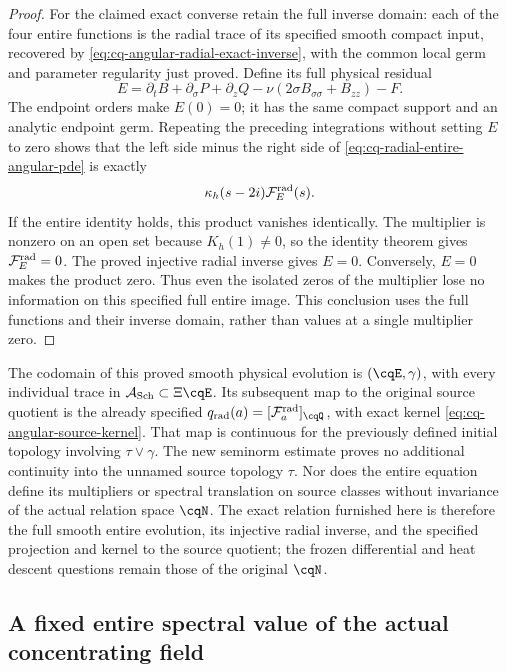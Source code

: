 \begin{proof}
For the claimed exact converse retain the full inverse domain:
each of the four entire functions is the radial trace of its
specified smooth compact input, recovered by
\eqref{eq:cq-angular-radial-exact-inverse}, with the common local
germ and parameter regularity just proved. Define its full
physical residual
\[
 E=\partial_tB+\partial_\sigma P+\partial_zQ
                  -\nu(2\sigma B_{\sigma\sigma}+B_{zz})-F.
\]
The endpoint orders make $E(0)=0$; it has the same compact support
and an analytic endpoint germ. Repeating the preceding integrations
without setting $E$ to zero shows that the left side minus the
right side of \eqref{eq:cq-radial-entire-angular-pde} is exactly
\begin{equation}
 \kappa_h(s-2i)\mathcal F_E^{\rm rad}(s).
\label{eq:cq-radial-entire-residual-defect}
\end{equation}
If the entire identity holds, this product vanishes identically.
The multiplier is nonzero on an open set because $K_h(1)\ne0$,
so the identity theorem gives $\mathcal F_E^{\rm rad}=0$.
The proved injective radial inverse gives $E=0$. Conversely,
$E=0$ makes the product zero. Thus even the isolated zeros of the
multiplier lose no information on this specified full entire
image. This conclusion uses the full functions and their inverse
domain, rather than values at a single multiplier zero.
\end{proof}

The codomain of this proved smooth physical evolution is
$(\cqE,\gamma)$, with every individual trace in
$\mathcal A_{\rm Sch}\subset\Xi\cqE$. Its subsequent map to
the original source quotient is the already specified
$q_{\rm rad}(a)=[\mathcal F_a^{\rm rad}]_{\cqQ}$, with exact
kernel \eqref{eq:cq-angular-source-kernel}. That map is continuous
for the previously defined initial topology involving
$\tau\vee\gamma$. The new seminorm estimate proves no additional
continuity into the unnamed source topology $\tau$. Nor does the
entire equation define its multipliers or spectral translation on
source classes without invariance of the actual relation space
$\cqN$. The exact relation furnished here is therefore the full
smooth entire evolution, its injective radial inverse, and the
specified projection and kernel to the source quotient; the
frozen differential and heat descent questions remain those of
the original $\cqN$.


\subsection{A fixed entire spectral value of the actual concentrating field}

